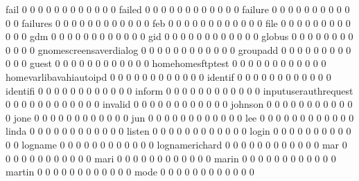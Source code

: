 \documentclass[compress,8pt]{beamer}
\begin{document}
\begin{frame}
\begin{Schunk}
  fail                                      0  0  0  0  0  0  0  0  0  0  0  0
  failed                                    0  0  0  0  0  0  0  0  0  0  0  0
  failure                                   0  0  0  0  0  0  0  0  0  0  0  0
  failures                                  0  0  0  0  0  0  0  0  0  0  0  0
  feb                                       0  0  0  0  0  0  0  0  0  0  0  0
  file                                      0  0  0  0  0  0  0  0  0  0  0  0
  gdm                                       0  0  0  0  0  0  0  0  0  0  0  0
  gid                                       0  0  0  0  0  0  0  0  0  0  0  0
  globus                                    0  0  0  0  0  0  0  0  0  0  0  0
  gnomescreensaverdialog                    0  0  0  0  0  0  0  0  0  0  0  0
  groupadd                                  0  0  0  0  0  0  0  0  0  0  0  0
  guest                                     0  0  0  0  0  0  0  0  0  0  0  0
  homehomesftptest                          0  0  0  0  0  0  0  0  0  0  0  0
  homevarlibavahiautoipd                    0  0  0  0  0  0  0  0  0  0  0  0
  identif                                   0  0  0  0  0  0  0  0  0  0  0  0
  identifi                                  0  0  0  0  0  0  0  0  0  0  0  0
  inform                                    0  0  0  0  0  0  0  0  0  0  0  0
  inputuserauthrequest                      0  0  0  0  0  0  0  0  0  0  0  0
  invalid                                   0  0  0  0  0  0  0  0  0  0  0  0
  johnson                                   0  0  0  0  0  0  0  0  0  0  0  0
  jone                                      0  0  0  0  0  0  0  0  0  0  0  0
  jun                                       0  0  0  0  0  0  0  0  0  0  0  0
  lee                                       0  0  0  0  0  0  0  0  0  0  0  0
  linda                                     0  0  0  0  0  0  0  0  0  0  0  0
  listen                                    0  0  0  0  0  0  0  0  0  0  0  0
  login                                     0  0  0  0  0  0  0  0  0  0  0  0
  logname                                   0  0  0  0  0  0  0  0  0  0  0  0
  lognamerichard                            0  0  0  0  0  0  0  0  0  0  0  0
  mar                                       0  0  0  0  0  0  0  0  0  0  0  0
  mari                                      0  0  0  0  0  0  0  0  0  0  0  0
  marin                                     0  0  0  0  0  0  0  0  0  0  0  0
  martin                                    0  0  0  0  0  0  0  0  0  0  0  0
  mode                                      0  0  0  0  0  0  0  0  0  0  0  0

\end{Schunk}
\end{frame}
\end{document}
